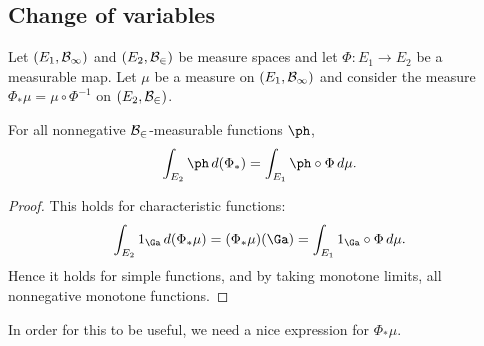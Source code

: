 
\subsection{Change of variables}
Let $(E_1,\cal B_1)$ and $(E_2,\cal B_2)$ be measure spaces and let $\Phi:E_1\to E_2$ be a measurable map. Let $\mu$ be a measure on $(E_1,\cal B_1)$ and consider the measure $\Phi_*\mu=\mu\circ \Phi^{-1}$ on $(E_2,\cal B_2)$.
\begin{thm}
For all nonnegative $\cal B_2$-measurable functions $\ph$,
\[
\int_{E_2}\ph\,d(\Phi_*)=\int_{E_1}\ph\circ\Phi\,d\mu. 
\]
\end{thm}
\begin{proof}
This holds for characteristic functions:
\[
\int_{E_2} 1_{\Ga}\,d(\Phi_*\mu)=(\Phi_*\mu)(\Ga)=\int_{E_1}1_{\Ga}\circ\Phi\,d\mu.
\]
Hence it holds for simple functions, and by taking monotone limits, all nonnegative monotone functions.
\end{proof}
In order for this to be useful, we need a nice expression for $\Phi_*\mu$.

